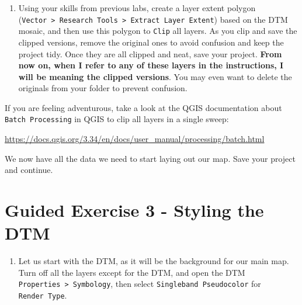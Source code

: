 \documentclass[
  letterpaper,
  DIV=11,
  numbers=noendperiod]{scrreprt}
\providecommand{\tightlist}{%
  \setlength{\itemsep}{0pt}\setlength{\parskip}{0pt}}\usepackage{longtable,booktabs,array}
\begin{document}
\begin{enumerate}
\def\labelenumi{(\arabic{enumi})}
\setcounter{enumi}{204}
\tightlist
\item
  Using your skills from previous labs, create a layer extent polygon
  (\texttt{Vector\ \textgreater{}\ Research\ Tools\ \textgreater{}\ Extract\ Layer\ Extent})
  based on the DTM mosaic, and then use this polygon to \texttt{Clip}
  all layers. As you clip and save the clipped versions, remove the
  original ones to avoid confusion and keep the project tidy. Once they
  are all clipped and neat, save your project. \textbf{From now on, when
  I refer to any of these layers in the instructions, I will be meaning
  the clipped versions}. You may even want to delete the originals from
  your folder to prevent confusion.
\end{enumerate}

\begin{tcolorbox}[enhanced jigsaw, breakable, toptitle=1mm, colback=white, left=2mm, leftrule=.75mm, titlerule=0mm, colframe=quarto-callout-tip-color-frame, opacityback=0, title=\textcolor{quarto-callout-tip-color}{\faLightbulb}\hspace{0.5em}{Tip}, toprule=.15mm, opacitybacktitle=0.6, bottomtitle=1mm, colbacktitle=quarto-callout-tip-color!10!white, bottomrule=.15mm, coltitle=black, rightrule=.15mm, arc=.35mm]

If you are feeling adventurous, take a look at the QGIS documentation
about \texttt{Batch\ Processing} in QGIS to clip all layers in a single
sweep:

\url{https://docs.qgis.org/3.34/en/docs/user_manual/processing/batch.html}

\end{tcolorbox}

We now have all the data we need to start laying out our map. Save your
project and continue.

\section{Guided Exercise 3 - Styling the
DTM}\label{guided-exercise-3---styling-the-dtm}

\begin{enumerate}
\def\labelenumi{(\arabic{enumi})}
\setcounter{enumi}{205}
\tightlist
\item
  Let us start with the DTM, as it will be the background for our main
  map. Turn off all the layers except for the DTM, and open the DTM
  \texttt{Properties\ \textgreater{}\ Symbology}, then select
  \texttt{Singleband\ Pseudocolor} for \texttt{Render\ Type}.
\end{enumerate}
\end{document}
